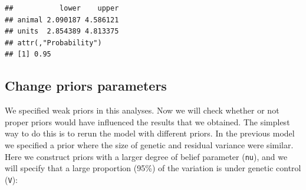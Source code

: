 \documentclass[
  12pt,
]{book}
\newenvironment{Shaded}{\begin{snugshade}}{\end{snugshade}}
\newcommand{\DataTypeTok}[1]{\textcolor[rgb]{0.13,0.29,0.53}{#1}}
\newcommand{\DecValTok}[1]{\textcolor[rgb]{0.00,0.00,0.81}{#1}}
\newcommand{\FloatTok}[1]{\textcolor[rgb]{0.00,0.00,0.81}{#1}}
\newcommand{\KeywordTok}[1]{\textcolor[rgb]{0.13,0.29,0.53}{\textbf{#1}}}
\newcommand{\NormalTok}[1]{#1}
\newcommand{\OperatorTok}[1]{\textcolor[rgb]{0.81,0.36,0.00}{\textbf{#1}}}
\newcommand{\OtherTok}[1]{\textcolor[rgb]{0.56,0.35,0.01}{#1}}
\newcommand{\StringTok}[1]{\textcolor[rgb]{0.31,0.60,0.02}{#1}}
\begin{document}
\begin{verbatim}
##           lower    upper
## animal 2.090187 4.586121
## units  2.854389 4.813375
## attr(,"Probability")
## [1] 0.95
\end{verbatim}

\hypertarget{change-priors-parameters}{%
\subsection{Change priors parameters}\label{change-priors-parameters}}

We specified weak priors in this analyses. Now we will check whether or not proper priors would have influenced the results that we obtained. The simplest way to do this is to rerun the model with different priors. In the previous model we specified a prior where the size of genetic and residual variance were similar. Here we construct priors with a larger degree of belief parameter (\texttt{nu}), and we will specify that a large proportion (95\%) of the variation is under genetic control (\texttt{V}):

\begin{Shaded}
\end{Shaded}
\end{document}
